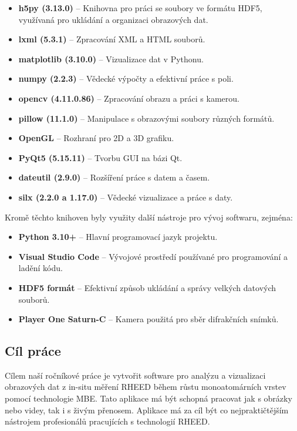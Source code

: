 \documentclass{article}
\begin{document}
\begin{itemize}
    \item \textbf{h5py (3.13.0)} – Knihovna pro práci se soubory ve formátu HDF5, využívaná pro ukládání a organizaci obrazových dat.
    \item \textbf{lxml (5.3.1)} – Zpracování XML a HTML souborů.
    \item \textbf{matplotlib (3.10.0)} – Vizualizace dat v Pythonu.
    \item \textbf{numpy (2.2.3)} – Vědecké výpočty a efektivní práce s poli.
    \item \textbf{opencv (4.11.0.86)} – Zpracování obrazu a práci s kamerou.
    \item \textbf{pillow (11.1.0)} – Manipulace s obrazovými soubory různých formátů.
    \item \textbf{OpenGL} – Rozhraní pro 2D a 3D grafiku.
    \item \textbf{PyQt5 (5.15.11)} – Tvorbu GUI na bázi Qt.
    \item \textbf{dateutil (2.9.0)} – Rozšíření práce s datem a časem.
    \item \textbf{silx (2.2.0 a 1.17.0)} – Vědecké vizualizace a práce s daty.
\end{itemize}

Kromě těchto knihoven byly využity další nástroje pro vývoj softwaru, zejména:

\begin{itemize}
    \item \textbf{Python 3.10+} – Hlavní programovací jazyk projektu.
    \item \textbf{Visual Studio Code} – Vývojové prostředí používané pro programování a ladění kódu.
    \item \textbf{HDF5 formát} – Efektivní způsob ukládání a správy velkých datových souborů.
    \item \textbf{Player One Saturn-C} – Kamera použitá pro sběr difrakčních snímků.
\end{itemize}

\subsection{Cíl práce}
    Cílem naší ročníkové práce je vytvořit software pro analýzu a vizualizaci obrazových dat z in-situ  měření RHEED během růstu monoatomárních vrstev pomocí technologie MBE. Tato aplikace má být schopná pracovat jak s obrázky nebo videy, tak i s živým přenosem. Aplikace má za cíl být co nejpraktičtějším nástrojem profesionálů pracujících s technologií RHEED.
\end{document}
